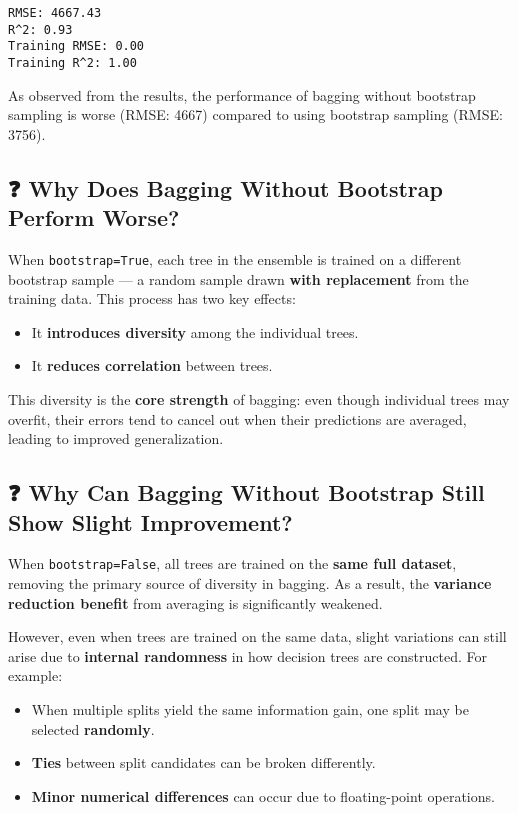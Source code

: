 \documentclass[
  letterpaper,
  DIV=11,
  numbers=noendperiod]{scrreprt}
\providecommand{\tightlist}{%
  \setlength{\itemsep}{0pt}\setlength{\parskip}{0pt}}\usepackage{longtable,booktabs,array}
\begin{document}
\begin{verbatim}
RMSE: 4667.43
R^2: 0.93
Training RMSE: 0.00
Training R^2: 1.00
\end{verbatim}

As observed from the results, the performance of bagging without
bootstrap sampling is worse (RMSE: 4667) compared to using bootstrap
sampling (RMSE: 3756).

\subsection{❓ Why Does Bagging Without Bootstrap Perform
Worse?}\label{why-does-bagging-without-bootstrap-perform-worse}

When \texttt{bootstrap=True}, each tree in the ensemble is trained on a
different bootstrap sample --- a random sample drawn \textbf{with
replacement} from the training data. This process has two key effects:

\begin{itemize}
\tightlist
\item
  It \textbf{introduces diversity} among the individual trees.
\item
  It \textbf{reduces correlation} between trees.
\end{itemize}

This diversity is the \textbf{core strength} of bagging: even though
individual trees may overfit, their errors tend to cancel out when their
predictions are averaged, leading to improved generalization.

\subsection{❓ Why Can Bagging Without Bootstrap Still Show Slight
Improvement?}\label{why-can-bagging-without-bootstrap-still-show-slight-improvement}

When \texttt{bootstrap=False}, all trees are trained on the \textbf{same
full dataset}, removing the primary source of diversity in bagging. As a
result, the \textbf{variance reduction benefit} from averaging is
significantly weakened.

However, even when trees are trained on the same data, slight variations
can still arise due to \textbf{internal randomness} in how decision
trees are constructed. For example:

\begin{itemize}
\tightlist
\item
  When multiple splits yield the same information gain, one split may be
  selected \textbf{randomly}.
\item
  \textbf{Ties} between split candidates can be broken differently.
\item
  \textbf{Minor numerical differences} can occur due to floating-point
  operations.
\end{itemize}
\end{document}
